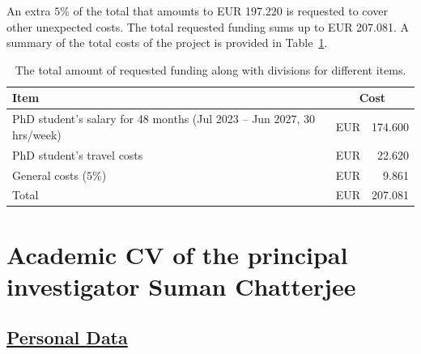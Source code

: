 \documentclass[a4paper,11pt]{article}
\begin{document}

An extra $5\%$ of the total that amounts to EUR 197.220 is requested to cover other unexpected costs.  
The total requested funding sums up to EUR 207.081. 
A summary of the total costs of the project is provided in Table~\ref{Tab:Total_cost}.
\begin{table}
\caption{The total amount of requested funding along with divisions for different items.}
\begin{center}
{\renewcommand{\arraystretch}{1.3}
\begin{tabular}{m{6 cm}| r r}
Item & \multicolumn{2}{c}{ Cost } \\
\hline 
PhD student's salary for 48 months (Jul 2023 -- Jun 2027, 30 hrs/week) & EUR & 174.600  \\
PhD student's travel costs & EUR & 22.620 \\
\hline
General costs ($5\%$) & EUR & 9.861  \\
\hline
Total & EUR & 207.081
\end{tabular}
}
\end{center}
\label{Tab:Total_cost}
\end{table}

\newpage
\clearpage

\section{Academic CV of the principal investigator Suman Chatterjee}

\subsection*{\underline{Personal Data}}
\end{document}
